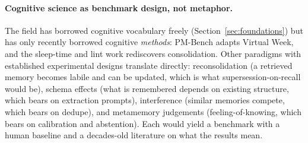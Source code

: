 \documentclass[11pt]{article}
\begin{document}
\paragraph{Cognitive science as benchmark design, not metaphor.}
The field has borrowed cognitive vocabulary freely (Section~\ref{sec:foundations}) but has only recently borrowed cognitive \emph{methods}: PM-Bench adapts Virtual Week, and the sleep-time and lint work rediscovers consolidation. Other paradigms with established experimental designs translate directly: reconsolidation (a retrieved memory becomes labile and can be updated, which is what supersession-on-recall would be), schema effects (what is remembered depends on existing structure, which bears on extraction prompts), interference (similar memories compete, which bears on dedupe), and metamemory judgements (feeling-of-knowing, which bears on calibration and abstention). Each would yield a benchmark with a human baseline and a decades-old literature on what the results mean.
\end{document}
